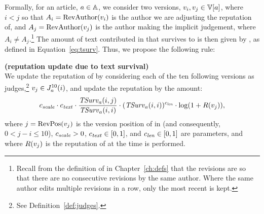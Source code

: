 Formally, for an article, $a \in \mathbb{A}$,
we consider two versions, $\version{i}, \version{j} \in \versions{a}$,
where $i < j$ so that $A_i = \mathrm{RevAuthor}(v_{i})$ is the author we are
adjusting the reputation of, and $A_j = \mathrm{RevAuthor}(v_{j})$ is the author
making the implicit judgement, where $A_i \not = A_j$.\footnote{Recall
from the definition of \versions{\article{}} in Chapter~\ref{ch:defs}
that the revisions are  so that there are no consecutive
revisions by the same author.
Where the same author edits multiple revisions in a row, only the
most recent is kept.}
The amount of text contributed in  that survives
to  is then given by , as defined in
Equation~\ref{eq:tsurv}.
Thus, we propose the following rule:

\begin{regola}
\textbf{(reputation update due to text survival)} \\
\label{rule-text}
  We update the reputation of  by considering
  each of the ten following versions as judges,\footnote{See
  Definition~\ref{def:judges}.}
  $v_j \in J_{a}^{10}(i)$, and update the reputation by the amount:
  \[
    {c_{{\text{\textit{scale}}}}} \cdot {c_{{\text{\textit{text}}}}} \cdot \frac{\mathit{TSurv}_{a}(i,j)}{\mathit{TSurv}_{a}(i,i)}
    \cdot (\mathit{TSurv}_{a}(i,i))^{c_{{\text{\textit{len}}}}} \cdot \log(1 + R(v_{j})),
  \]
  where $j = \mathrm{RevPos}(v_{j})$ is the version position of 
  in  (and consequently, $0 < j - i \le 10$),
  ${c_{{\text{\textit{scale}}}}} > 0$, ${c_{{\text{\textit{text}}}}} \in [0,1]$, and ${c_{{\text{\textit{len}}}}} \in
  [0,1]$ are parameters, and where $R(v_{j})$ is the reputation of
   at the time  is performed.
\end{regola}

